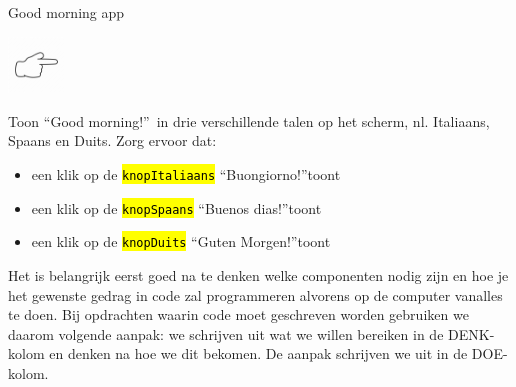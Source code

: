 \begin{opdracht}{Good morning app}
	\begin{minipage}{.1\linewidth}
	\includegraphics[width=1.5cm]{inputs/opdracht}
	\vspace{5cm}
	\end{minipage}
	\begin{minipage}{.5\linewidth}
	 Toon \textquotedblleft Good morning!\textquotedblright \ in drie verschillende talen op het scherm, nl. Italiaans, Spaans en Duits. 
	 Zorg ervoor dat:
	 \begin{itemize}
	 	\item een klik op de \hl{\texttt{knopItaliaans}} \textquotedblleft Buongiorno!\textquotedblright toont
	 	\item een klik op de \hl{\texttt{knopSpaans}} \textquotedblleft Buenos dias!\textquotedblright toont
	 	\item een klik op de \hl{\texttt{knopDuits}} \textquotedblleft Guten Morgen!\textquotedblright toont
	 \end{itemize}
	\end{minipage}
	\begin{minipage}{.3\linewidth}
	\end{minipage}

	Het is belangrijk eerst goed na te denken welke componenten nodig zijn en hoe je het gewenste gedrag in code zal programmeren alvorens op de computer vanalles te doen. Bij opdrachten waarin code moet geschreven worden gebruiken we daarom volgende aanpak: we schrijven uit wat we willen bereiken in de DENK-kolom en denken na hoe we dit bekomen. De aanpak schrijven we uit in de DOE-kolom. 
	

\end{opdracht}
